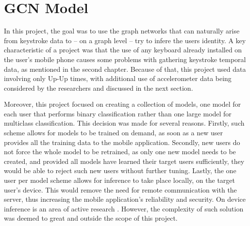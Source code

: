 \chapter{GCN Model}

In this project, the goal was to use the graph networks that can naturally arise from keystroke data to -- on a graph level -- try to infere the users identity. A key characteristic of a project was that the use of any keyboard already installed on the user's mobile phone causes some problems with gathering keystroke temporal data, as mentioned in the second chapter. Because of that, this project used data involving only Up-Up times, with additional use of accelerometer data being considered by the researchers and discussed in the next section. 

Moreover, this project focused on creating a collection of models, one model for each user that performs binary classification rather than one large model for multiclass classification. 
This decision was made for several reasons. Firstly, such scheme allows for models to be trained on demand, as soon as a new user provides all the training data to the mobile application. Secondly, new users do not force the whole model to be retrained, 
as only one new model needs to be created, and provided all models have learned their target users sufficiently, they would be able to reject such new users without further tuning. Lastly, the one user per model scheme allows for inference to take place locally, on the target user's device. This would remove the need for remote communication with the server, thus increasing the mobile application's reliability and security. On device inference is an area of active research \cite{48305}. However, the complexity of such solution was deemed to great and outside the scope of this project.

